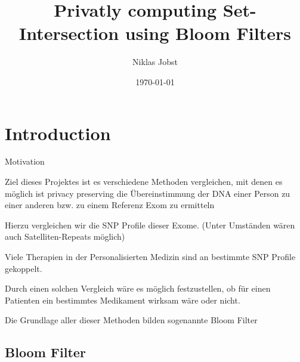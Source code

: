 \documentclass{beamer}
\title[Privatly computing Set-Intersection]{Privatly computing Set-Intersection using Bloom Filters}
\author{Niklas Jobst}
\institute{TCS - Universität zu Lübeck}
\date{\today}
\begin{document}
\begin{frame}
  \titlepage
\end{frame}


\section{Introduction}

\begin{frame}{Motivation}

\begin{arrowlist}
	\item  Ziel dieses Projektes ist es verschiedene Methoden vergleichen, mit denen es möglich ist privacy preserving die Übereinstimmung der DNA einer Person zu einer anderen bzw. zu einem Referenz Exom zu ermitteln
	\item Hierzu vergleichen wir die SNP Profile dieser Exome.	
	(Unter Umständen wären auch Satelliten-Repeats möglich)

\end{arrowlist}



\end{frame}

\begin{frame}

\begin{arrowlist}

	\item Viele Therapien in der Personalisierten Medizin sind an bestimmte SNP Profile gekoppelt.
	\item Durch einen solchen Vergleich wäre es möglich festzustellen, ob für einen Patienten ein bestimmtes Medikament wirksam wäre oder nicht. 
	\item Die Grundlage aller dieser Methoden bilden sogenannte Bloom Filter
\end{arrowlist}



\end{frame}
\subsection{Bloom Filter}
\end{document}
